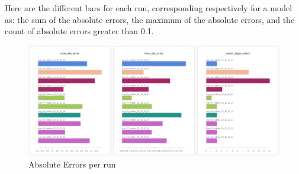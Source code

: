 \documentclass[11pt]{article}
\begin{document}
Here are the different bars for each run, corresponding respectively for a model as: the sum of the absolute errors, the maximum of the absolute errors, and the count of absolute errors greater than 0.1.\\[0pt]

\begin{figure}[htbp]
\centering
\includegraphics[width=.9\linewidth]{img/bar_errors.png}
\caption{Absolute Errors per run}
\end{figure}\\[0pt]
\end{document}
